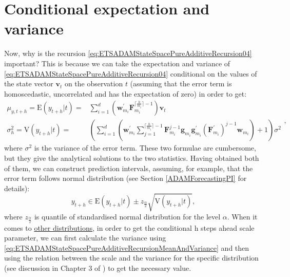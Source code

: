 \documentclass[
]{book}
\theoremstyle{definition}
\theoremstyle{definition}
\theoremstyle{definition}
\theoremstyle{definition}
\theoremstyle{remark}
\begin{document}
\hypertarget{pureAdditiveExpectationAndVariance}{%
\section{Conditional expectation and variance}\label{pureAdditiveExpectationAndVariance}}

Now, why is the recursion \eqref{eq:ETSADAMStateSpacePureAdditiveRecursion04} important? This is because we can take the expectation and variance of \eqref{eq:ETSADAMStateSpacePureAdditiveRecursion04} conditional on the values of the state vector \(\mathbf{v}_{t}\) on the observation \(t\) (assuming that the error term is homoscedastic, uncorrelated and has the expectation of zero) in order to get:
\begin{equation}
  \begin{aligned}
    \mu_{y,t+h} = \text{E}(y_{t+h}|t) = & \sum_{i=1}^d \left(\mathbf{w}_{m_i}^\prime \mathbf{F}_{m_i}^{\lceil\frac{h}{m_i}\rceil-1} \right) \mathbf{v}_{t} \\
    \sigma^2_{h} = \text{V}(y_{t+h}|t) = & \left( \sum_{i=1}^d \left(\mathbf{w}_{m_i}^\prime \sum_{j=1}^{\lceil\frac{h}{m_i}\rceil-1} \mathbf{F}_{m_i}^{j-1} \mathbf{g}_{m_i} \mathbf{g}^\prime_{m_i} (\mathbf{F}_{m_i}^\prime)^{j-1} \mathbf{w}_{m_i} \right) + 1 \right) \sigma^2
  \end{aligned},
  \label{eq:ETSADAMStateSpacePureAdditiveRecursionMeanAndVariance}
\end{equation}
where \(\sigma^2\) is the variance of the error term. These two formulae are cumbersome, but they give the analytical solutions to the two statistics. Having obtained both of them, we can construct prediction intervals, assuming, for example, that the error term follows normal distribution (see Section \ref{ADAMForecastingPI} for details):
\begin{equation}
    y_{t+h} \in \text{E}(y_{t+h}|t) \pm z_{\frac{\alpha}{2}} \sqrt{\text{V}(y_{t+h}|t)} ,
  \label{eq:ETSADAMStateSpacePureAdditivePredictionInterval}
\end{equation}
where \(z_{\frac{\alpha}{2}}\) is quantile of standardised normal distribution for the level \(\alpha\). When it comes to \protect\hyperlink{ADAMETSAdditiveDistributions}{other distributions}, in order to get the conditional h steps ahead scale parameter, we can first calculate the variance using \eqref{eq:ETSADAMStateSpacePureAdditiveRecursionMeanAndVariance} and then using the relation between the scale and the variance for the specific distribution (see discussion in Chapter 3 of \citet{SvetunkovSBA}) to get the necessary value.
\end{document}
